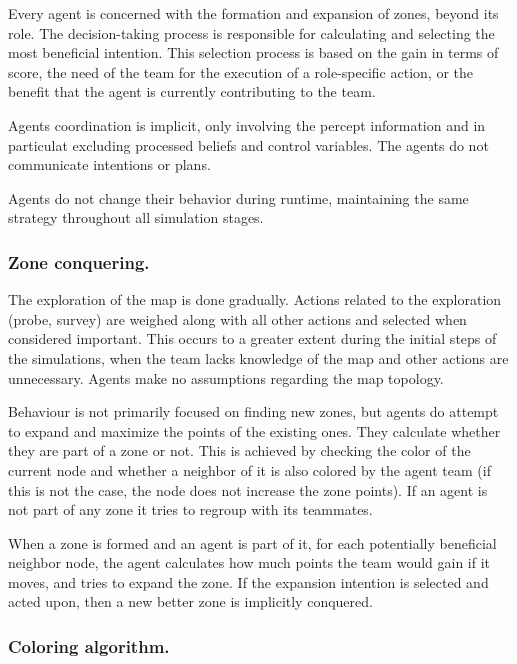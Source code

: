 \documentclass{llncs2e/llncs}
\begin{document}
    Every agent is concerned with the formation and expansion of zones, beyond
    its role.  The decision-taking process is responsible for calculating and
    selecting the most beneficial intention. This selection process is based on
    the gain in terms of score, the need of the team for the execution of
    a role-specific action, or the benefit that the agent is currently
    contributing to the team. 
    
    Agents coordination is implicit, only involving the percept information and
    in particulat excluding processed beliefs and control variables. The agents
    do not communicate intentions or plans.

    Agents do not change their behavior during runtime, maintaining the same
    strategy throughout all simulation stages. 

\subsubsection{Zone conquering.}
    
    The exploration of the map is done gradually. Actions related to the
    exploration (probe, survey) are weighed along with all other actions and
    selected when considered important.  This occurs to a greater extent during
    the initial steps of the simulations, when the team lacks knowledge of the
    map and other actions are unnecessary. Agents make no assumptions regarding
    the map topology.

    Behaviour is not primarily focused on finding new zones, but agents do
    attempt to expand and maximize the points of the existing ones.    They
    calculate whether they are part of a zone or not. This is achieved by
    checking the color of the current node and whether a neighbor of it is also
    colored by the agent team (if this is not the case, the node does not
    increase the zone points).  If an agent is not part of any zone it tries to
    regroup with its teammates. 

    When a zone is formed and an agent is part of it, for each potentially
    beneficial neighbor node, the agent calculates how much points the team
    would gain if it moves, and tries to expand the zone.  If the expansion
    intention is selected and acted upon, then a new better zone is implicitly
    conquered.
    
\subsubsection{Coloring algorithm.}    
    
\end{document}

